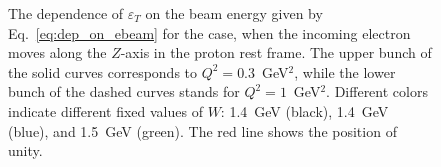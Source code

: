 \begin{figure}[!ht]
\begin{center}
\end{center}
\caption{\small  The dependence of $\varepsilon_{T}$ on the beam energy given by Eq.~\eqref{eq:dep_on_ebeam} for the case, when the incoming electron moves along the $Z$-axis in the proton rest frame. The upper bunch of the solid curves corresponds to $Q^{2} = 0.3$~GeV$^2$, while the lower bunch of the dashed curves stands for $Q^{2} = 1$~GeV$^2$. Different colors indicate different fixed values of $W$: 1.4~GeV (black), 1.4~GeV (blue), and 1.5~GeV (green). The red line shows the position of unity.}
\label{fig:eps_t_dep_ebeam}
\end{figure}


